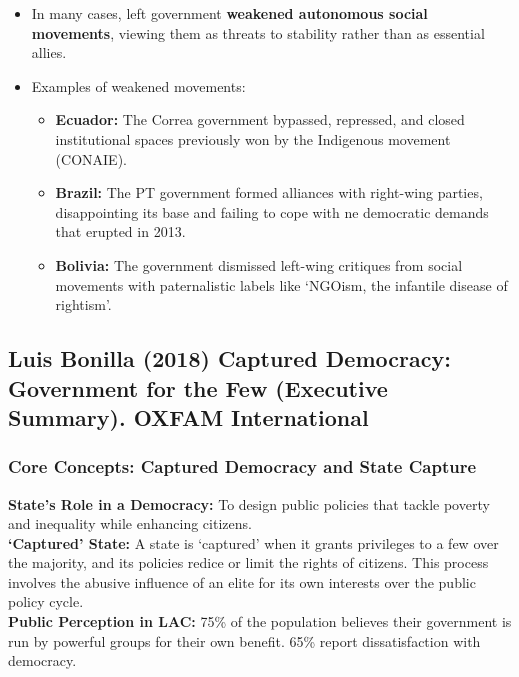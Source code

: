 \documentclass{article}
\begin{document}
\begin{itemize}
\begin{itemize}
            \item In many cases, left government
            \textbf{weakened autonomous social movements}, viewing them as
            threats to stability rather than as essential allies.
            \item Examples of weakened movements:
            \begin{itemize}
                \item \textbf{Ecuador:} The Correa government bypassed,
                repressed, and closed institutional spaces previously won by
                the Indigenous movement (CONAIE).
                \item \textbf{Brazil:} The PT government formed alliances
                with right-wing parties, disappointing its base and failing
                to cope with ne democratic demands that erupted in 2013.
                \item \textbf{Bolivia:} The government dismissed left-wing
                critiques from social movements with paternalistic labels
                like `NGOism, the infantile disease of rightism'.
            \end{itemize}
        \end{itemize}
    \end{itemize}

    \subsection{Luis Bonilla (2018) Captured Democracy: Government for the Few (Executive Summary). OXFAM International}

    \subsubsection{Core Concepts: Captured Democracy and State Capture}

    \noindent \textbf{State's Role in a Democracy:} To design public
policies that tackle poverty and inequality while enhancing citizens.\\

    \noindent \textbf{`Captured' State:} A state is `captured' when it
grants privileges to a few over the majority, and its policies redice or
limit the rights of citizens. This process involves the abusive influence of
an elite for its own interests over the public policy cycle.\\

    \noindent \textbf{Public Perception in LAC:} 75\% of the population
believes their government is run by powerful groups for their own benefit. 65\% report dissatisfaction with democracy.
\end{document}
